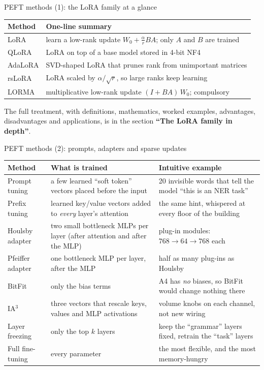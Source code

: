 \documentclass[aspectratio=169,11pt]{beamer}
\begin{document}
\begin{frame}{PEFT methods (1): the LoRA family at a glance}
  \small
  \begin{tabularx}{\textwidth}{@{}lX@{}}
    \toprule
    Method & One-line summary\\
    \midrule
    LoRA & learn a low-rank update $W_0+\tfrac{\alpha}{r}BA$; only $A$ and $B$ are trained\\
    QLoRA & LoRA on top of a base model stored in 4-bit NF4\\
    AdaLoRA & SVD-shaped LoRA that prunes rank from unimportant matrices\\
    rsLoRA & LoRA scaled by $\alpha/\sqrt r$, so large ranks keep learning\\
    LORMA & multiplicative low-rank update $(I+BA)\,W_0$; \alert{compulsory}\\
    \bottomrule
  \end{tabularx}
  \vspace{3mm}

  The full treatment, with definitions, mathematics, worked examples, advantages, disadvantages and applications, is in the section \textbf{``The LoRA family in depth''}.
\end{frame}

\begin{frame}{PEFT methods (2): prompts, adapters and sparse updates}
  \footnotesize
  \begin{tabularx}{\textwidth}{@{}l X X@{}}
    \toprule
    Method & What is trained & Intuitive example\\
    \midrule
    Prompt tuning & a few learned ``soft token'' vectors placed before the input & 20 invisible words that tell the model ``this is an NER task''\\
    Prefix tuning & learned key/value vectors added to \emph{every} layer's attention & the same hint, whispered at every floor of the building\\
    Houlsby adapter & two small bottleneck MLPs per layer (after attention and after the MLP) & plug-in modules: $768\to64\to768$ each\\
    Pfeiffer adapter & one bottleneck MLP per layer, after the MLP & half as many plug-ins as Houlsby\\
    BitFit & only the bias terms & A4 has \emph{no} biases, so BitFit would change nothing there\\
    IA$^3$ & three vectors that rescale keys, values and MLP activations & volume knobs on each channel, not new wiring\\
    Layer freezing & only the top $k$ layers & keep the ``grammar'' layers fixed, retrain the ``task'' layers\\
    Full fine-tuning & every parameter & the most flexible, and the most memory-hungry\\
    \bottomrule
  \end{tabularx}
\end{frame}
\end{document}
